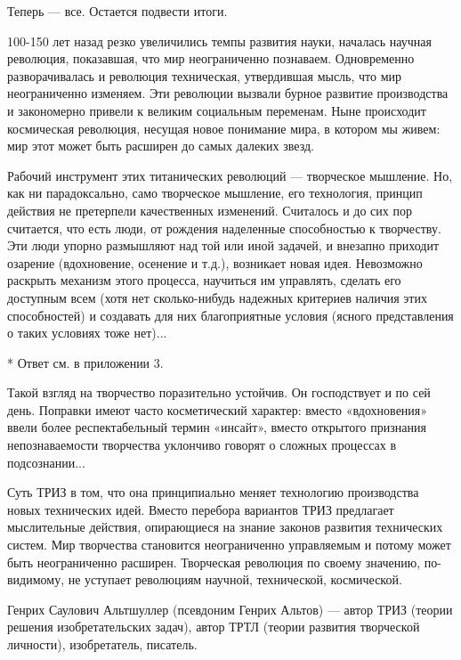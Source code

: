 Теперь — все. Остается подвести итоги.

100-150  лет назад  резко увеличились  темпы развития  науки, началась
научная  революция,  показавшая,   что  мир  неограниченно  познаваем.
Одновременно  разворачивалась  и  революция  техническая,  утвердившая
мысль, что  мир неограниченно  изменяем. Эти революции  вызвали бурное
развитие  производства  и  закономерно привели  к  великим  социальным
переменам.  Ныне  происходит   космическая  революция,  несущая  новое
понимание мира,  в котором мы живем:  мир этот может быть  расширен до
самых далеких звезд.

Рабочий инструмент этих титанических  революций — творческое мышление.
Но, как  ни парадоксально,  само творческое мышление,  его технология,
принцип действия не претерпели  качественных изменений. Считалось и до
сих пор считается, что есть  люди, от рождения наделенные способностью
к творчеству. Эти  люди упорно размышляют над той или  иной задачей, и
внезапно приходит  озарение (вдохновение, осенение и  т.д.), возникает
новая  идея. Невозможно  раскрыть механизм  этого процесса,  научиться
им  управлять, сделать  его  доступным всем  (хотя нет  сколько-нибудь
надежных  критериев наличия  этих  способностей) и  создавать для  них
благоприятные  условия (ясного  представления  о  таких условиях  тоже
нет)...

* Ответ см. в приложении 3.


Такой взгляд  на творчество  поразительно устойчив. Он  господствует и
по  сей  день. Поправки  имеют  часто  косметический характер:  вместо
«вдохновения»  ввели  более  респектабельный термин  «инсайт»,  вместо
открытого  признания непознаваемости  творчества  уклончиво говорят  о
сложных процессах в подсознании...

Суть   ТРИЗ   в  том,   что   она   принципиально  меняет   технологию
производства новых  технических идей.  Вместо перебора  вариантов ТРИЗ
предлагает  мыслительные  действия,   опирающиеся  на  знание  законов
развития технических  систем. Мир творчества  становится неограниченно
управляемым  и потому  может быть  неограниченно расширен.  Творческая
революция  по своему  значению,  по-видимому,  не уступает  революциям
научной, технической, космической.




Генрих  Саулович Альтшуллер  (псевдоним  Генрих Альтов)  — автор  ТРИЗ
(теории решения  изобретательских задач), автор ТРТЛ  (теории развития
творческой личности), изобретатель, писатель.

